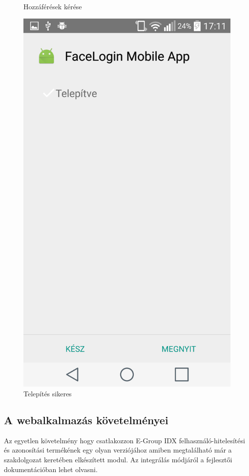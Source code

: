 \begin{figure}[h]
\begin{minipage}{.5\textwidth}
    \caption{Hozzáférések kérése}
 \end{minipage}
 \begin{minipage}{.5\textwidth} 
\centering
     \includegraphics[scale=0.10]{img/app_installed}
     \caption{Telepítés sikeres}
 \end{minipage}
\end{figure}

\subsection{A webalkalmazás követelményei}
Az egyetlen követelmény hogy csatlakozzon  E-Group IDX felhasználó-hitelesítési és azonosítási termékének egy olyan verziójához amiben megtalálható már a szakdolgozat keretében elkészített modul. Az integrálás módjáról a fejlesztői dokumentációban lehet olvasni.

